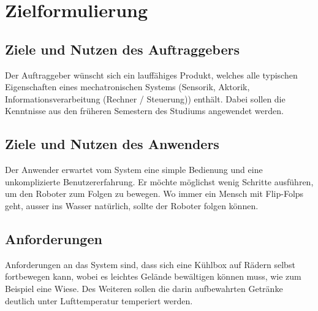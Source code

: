 \section{Zielformulierung}

\subsection{Ziele und Nutzen des Auftraggebers}
Der Auftraggeber wünscht sich ein lauffähiges Produkt, welches alle typischen Eigenschaften eines mechatronischen Systems (Sensorik, Aktorik, Informationsverarbeitung (Rechner / Steuerung)) enthält. Dabei sollen die Kenntnisse aus den früheren Semestern des Studiums angewendet werden.

\subsection{Ziele und Nutzen des Anwenders}
Der Anwender erwartet vom System eine simple Bedienung und eine unkomplizierte Benutzererfahrung. Er möchte möglichst wenig Schritte ausführen, um den Roboter zum Folgen zu bewegen. Wo immer ein Mensch mit Flip-Folps  geht, ausser ins Wasser natürlich, sollte der Roboter folgen können.

\subsection{Anforderungen}
Anforderungen an das System sind, dass sich eine Kühlbox auf Rädern selbst fortbewegen kann, wobei es leichtes Gelände bewältigen können muss, wie zum Beispiel eine Wiese. Des Weiteren sollen die darin aufbewahrten Getränke deutlich unter Lufttemperatur temperiert werden.

